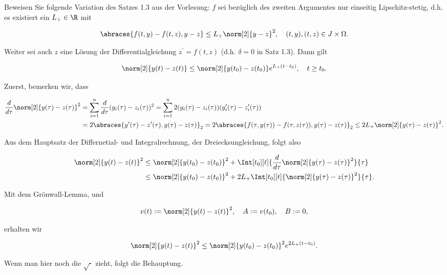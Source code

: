 \begin{exercise}

Beweisen Sie folgende Variation des Satzes 1.3 aus der Vorlesung:
$f$ sei bezüglich des zweiten Argumentes nur einseitig Lipschitz-stetig, d.h. es existiert ein $L_+ \in \R$ mit

\begin{align*}
  \abraces{f(t, y) - f(t, z), y - z}
  \leq
  L_+ \norm[2]{y - z}^2,
  \quad
  (t, y), (t, z) \in J \times \Omega.
\end{align*}

Weiter sei auch $z$ eine Lösung der Differentialgleichung $z^\prime = f(t, z)$ (d.h. $\delta = 0$ in Satz 1.3). Dann gilt

\begin{align*}
  \norm[2]{y(t) - z(t)}
  \leq
  \norm[2]{y(t_0) - z(t_0)} e^{L_+ (t - t_0)},
  \quad
  t \geq t_0.
\end{align*}

\end{exercise}

\begin{solution}

Zuerst, bemerken wir, dass

\begin{align*}
  \frac{d}{d \tau} \norm[2]{y(\tau) - z(\tau)}^2
  & =
  \sum_{i=1}^n \frac{d}{d \tau} (y_i(\tau) - z_i(\tau))^2
  =
  \sum_{i=1}^n 2 (y_i(\tau) - z_i(\tau))(y_i^\prime(\tau) - z_i^\prime(\tau)) \\
  & =
  2 \abraces
  {
    y^\prime(\tau) - z^\prime(\tau),
    y(\tau) - z(\tau)
  }_2
  =
  2 \abraces
  {
    f(\tau, y(\tau)) - f(\tau, z(\tau)),
    y(\tau) - z(\tau)
  }_2
  \leq
  2 L_+ \norm[2]{y(\tau) - z(\tau)}^2.
\end{align*}

Aus dem Hauptsatz der Differnetial- und Integralrechnung, der Dreiecksungleichung, folgt also

\begin{align*}
  \norm[2]{y(t) - z(t)}^2
  & \leq
  \norm[2]{y(t_0) - z(t_0)}^2
  +
  \Int[t_0][t]
  {\frac{d}{d \tau} \norm[2]{y(\tau) - z(\tau)}^2}{\tau} \\
  & \leq
  \norm[2]{y(t_0) - z(t_0)}^2
  +
  2 L_+ \Int[t_0][t]
  {\norm[2]{y(\tau) - z(\tau)}^2}{\tau}.
\end{align*}

Mit dem Grönwall-Lemma, und

\begin{align*}
  v(t) := \norm[2]{y(t) - z(t)}^2,
  \quad
  A := v(t_0),
  \quad
  B := 0,
\end{align*}

erhalten wir

\begin{align*}
  \norm[2]{y(t) - z(t)}^{2}
  \leq
  \norm[2]{y(t_0) - z(t_0)}^2 e^{2 L_+ (t - t_0)}.
\end{align*}

Wenn man hier noch die $\sqrt{\cdot}$ zieht, folgt die Behauptung.

\end{solution}
